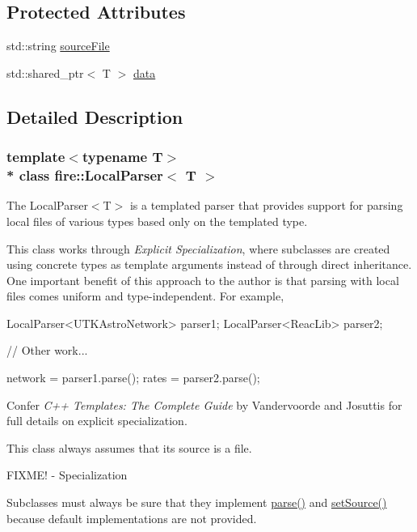 \subsection*{Protected Attributes}
\begin{DoxyCompactItemize}
\item 
std\+::string \hyperlink{a00019_acf921ee916266efe70be5b24bec37fce}{source\+File}
\item 
std\+::shared\+\_\+ptr$<$ T $>$ \hyperlink{a00019_af8f722c7e35378c69e76e4275d384d86}{data}
\end{DoxyCompactItemize}


\subsection{Detailed Description}
\subsubsection*{template$<$typename T$>$\\*
class fire\+::\+Local\+Parser$<$ T $>$}

The Local\+Parser$<$\+T$>$ is a templated parser that provides support for parsing local files of various types based only on the templated type.

This class works through {\itshape Explicit Specialization}, where subclasses are created using concrete types as template arguments instead of through direct inheritance. One important benefit of this approach to the author is that parsing with local files comes uniform and type-\/independent. For example,


\begin{DoxyCode}
LocalParser<UTKAstroNetwork> parser1;
LocalParser<ReacLib> parser2;

\textcolor{comment}{// Other work...}

network = parser1.parse();
rates = parser2.parse();
\end{DoxyCode}


Confer {\itshape C++ Templates\+: The Complete Guide} by Vandervoorde and Josuttis for full details on explicit specialization.

This class always assumes that its source is a file.

F\+I\+X\+M\+E! -\/ Specialization

Subclasses must always be sure that they implement \hyperlink{a00019_abd8929aea06c2dda40256d2e58236650}{parse()} and \hyperlink{a00019_afcaec6429fdd6e5d53642a32c001ff73}{set\+Source()} because default implementations are not provided. 

